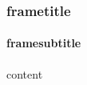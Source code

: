\documentclass{beamer}
\begin{document}
\begin{frame}
\frametitle{frametitle}
\framesubtitle{framesubtitle}
content
\end{frame}
\end{document}
